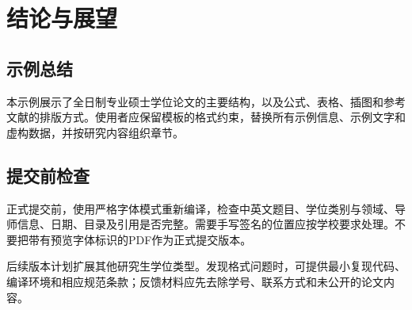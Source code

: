 \chapter{结论与展望}
\section{示例总结}
本示例展示了全日制专业硕士学位论文的主要结构，以及公式、表格、插图和参考文献的排版方式。使用者应保留模板的格式约束，替换所有示例信息、示例文字和虚构数据，并按研究内容组织章节。
\section{提交前检查}
正式提交前，使用严格字体模式重新编译，检查中英文题目、学位类别与领域、导师信息、日期、目录及引用是否完整。需要手写签名的位置应按学校要求处理。不要把带有预览字体标识的PDF作为正式提交版本。

后续版本计划扩展其他研究生学位类型。发现格式问题时，可提供最小复现代码、编译环境和相应规范条款；反馈材料应先去除学号、联系方式和未公开的论文内容。
